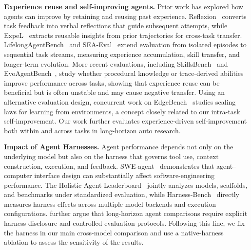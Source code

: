\textbf{Experience reuse and self-improving agents.}
Prior work has explored how agents can improve by retaining and reusing past experience. 
Reflexion~\citep{Shinn2023Reflexion} converts task feedback into verbal reflections that guide subsequent attempts, while ExpeL~\citep{Zhao2024ExpeL} extracts reusable insights from prior trajectories for cross-task transfer. 
LifelongAgentBench~\citep{zheng2025lifelongagentbench} and SEA-Eval~\citep{jiang2026seaeval} extend evaluation from isolated episodes to sequential task streams, measuring experience accumulation, skill transfer, and longer-term evolution. 
More recent evaluations, including SkillsBench~\citep{li2026skillsbench} and EvoAgentBench~\citep{gao2026evoagentbench}, study whether procedural knowledge or trace-derived abilities improve performance across tasks, showing that experience reuse can be beneficial but is often unstable and may cause negative transfer. 
Using an alternative evaluation design, concurrent work on EdgeBench~\citep{zhu2026edgebenchunveilingscalinglaws} studies scaling laws for learning from environments, a concept closely related to our intra-task self-improvement.
Our work further evaluates experience-driven self-improvement both within and across tasks in long-horizon auto research.

\textbf{Impact of Agent Harnesses.}
Agent performance depends not only on the underlying model but also on the harness that governs tool use, context construction, execution, and feedback. 
SWE-agent~\citep{Yang2024SWEagent} demonstrates that agent--computer interface design can substantially affect software-engineering performance. 
The Holistic Agent Leaderboard~\citep{kapoor2026holistic} jointly analyzes models, scaffolds, and benchmarks under standardized evaluation, while Harness-Bench~\citep{yao2026harnessbench} directly measures harness effects across multiple model backends and execution configurations. 
\citet{zhang2026stopcomparingllmagents} further argue that long-horizon agent comparisons require explicit harness disclosure and controlled evaluation protocols. 
Following this line, we fix the harness in our main cross-model comparison and use a native-harness ablation to assess the sensitivity of the results.

